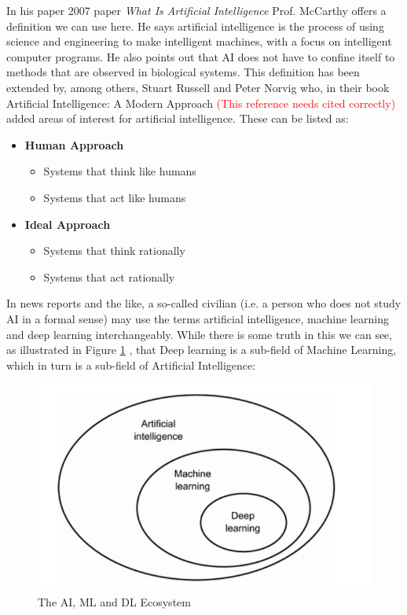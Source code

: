 \documentclass[conference]{IEEEtran}
\begin{document}
In his paper 2007 paper \textit{What Is Artificial Intelligence} \cite{whatisai_mccarthy} Prof. McCarthy offers a definition we can use here. He says artificial intelligence is the process of using science and engineering to make intelligent machines, with a focus on intelligent computer programs. He also points out that AI does not have to confine itself to methods that are observed in biological systems. This definition has been extended by, among others, Stuart Russell and Peter Norvig who, in their book Artificial Intelligence: A Modern Approach \textcolor{red}{(This reference needs cited correctly)} added areas of interest for artificial intelligence. These can be listed as:

\begin{itemize}
    \item \textbf{Human Approach}
    \begin{itemize}
        \item Systems that think like humans
        \item Systems that act like humans
    \end{itemize}
    \item \textbf{Ideal Approach}
    \begin{itemize}
        \item Systems that think rationally
        \item Systems that act rationally
    \end{itemize}
\end{itemize}

In news reports and the like, a so-called civilian (i.e. a person who does not study AI in a formal sense) may use the terms artificial intelligence, machine learning and deep learning interchangeably. While there is some truth in this we can see, as illustrated in Figure \ref{fig:ai-ml-dl} \cite{pythonDL}, that Deep learning is a sub-field of Machine Learning, which in turn is a sub-field of Artificial Intelligence:

\begin{figure}
    \centering
    \includegraphics[scale=0.3]{ai-ml-dl.png}
    \caption{The AI, ML and DL Ecosystem}
    \label{fig:ai-ml-dl}
\end{figure}
\end{document}
